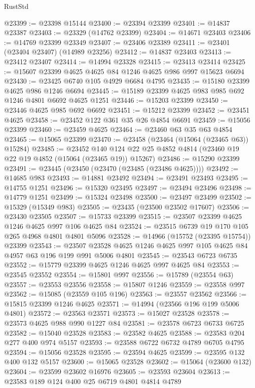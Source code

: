 \begin{lexlean}{RustStd}
\begin{coremodule}
@23399 := @23398 @15144
@23400 := @23394 @23399
@23401 := @14837 @23387
@23403 := @23329 (@14762 @23399)
@23404 := @14671 @23403
@23406 := @14769 @23399 @23349
@23407 := @23406 @23389
@23411 := @23401 (@23404 @23407) (@14989 @23256)
@23412 := @14837 @23403
@23413 := @23412 @23407
@23414 := @14994 @23328
@23415 := @23413 @23414
@23425 := @15607 @23399 @4625 @4625 @84 @1246 @4625 @986 @997 @15623 @6694
@23430 := @23425 @6740 @105 @4929 @6684 @4795
@23435 := @15180 @23399 @4625 @986 @1246 @6694
@23445 := @15189 @23399 @4625 @983 @985 @692 @1246 @4801 @6692 @4625 @1251
@23446 := @15203 @23399
@23450 := @23446 @4625 @985 @692 @6692
@23451 := @15212 @23399
@23452 := @23451 @4625
@23458 := @23452 @122 @361 @35 @26 @4854 @6691
@23459 := @15056 @23399
@23460 := @23459 @4625
@23464 := @23460 @63 @35 @63 @4854
@23465 := @15065 @23399
@23470 := @23458 (@23464 (@15064 (@23465 @63)) @15284)
@23485 := @23452
    @140
    @124
    @22
    @25
    @4852
    @4814
    (@23460 @19 @22 @19 @4852 (@15064 (@23465 @19)) @15267)
@23486 := @15290 @23399
@23491 := @23445 (@23450 (@23470 (@23485 (@23486 @4625))))
@23492 := @14685 @983
@23493 := @14881 @23492
@23494 := @23491 @23493
@23495 := @14755 @1251
@23496 := @15320 @23495
@23497 := @23494 @23496
@23498 := @14779 @1251
@23499 := @15324 @23498
@23500 := @23497 @23499
@23502 := @15329 (@15349 @983)
@23505 := @23435 (@23500 @23502 @17607)
@23506 := @23430 @23505
@23507 := @15733 @23399
@23515 := @23507 @23399 @4625 @1246 @4625 @997 @106 @4625 @84
@23524 := @23515 @6739 @19 @170 @105 @265 @4968 @4801 @4801 @5096
@23528 := @14966 (@15752 (@23395 @15754)) @23399
@23543 := @23507 @23528 @4625 @1246 @4625 @997 @105 @4625 @84 @4957 @63 @196 @199 @991 @5006 @4801
@23545 := @23543 @6723 @6735
@23552 := @15779 @23399 @4625 @1246 @4625 @997 @4625 @84
@23553 := @23545 @23552
@23554 := @15801 @997
@23556 := @15789 (@23554 @63)
@23557 := @23553 @23556
@23558 := @15807 @1246
@23559 := @23558 @997
@23562 := @15085 (@23559 @105 @196)
@23563 := @23557 @23562
@23566 := @15815 @23399 @1246 @4625
@23571 := @14994 (@23566 @196 @199 @5006 @4801)
@23572 := @23563 @23571
@23573 := @15027 @23528
@23578 := @23573 @4625 @988 @990 @1227 @84
@23581 := @23578 @6723 @6733 @6725
@23582 := @15040 @23528
@23583 := @23582 @4625
@23588 := @23583 @204 @277 @400 @974 @5157
@23593 := @23588 @6722 @6732 @4789 @6705 @4795
@23594 := @15056 @23528
@23595 := @23594 @4625
@23599 := @23595 @132 @400 @132 @5157
@23600 := @15065 @23528
@23602 := @15064 (@23600 @132)
@23604 := @23599 @23602 @16976
@23605 := @23593 @23604
@23613 := @23583 @189 @124 @400 @25 @6719 @4801 @4814 @4789

\end{coremodule}
\end{lexlean}

